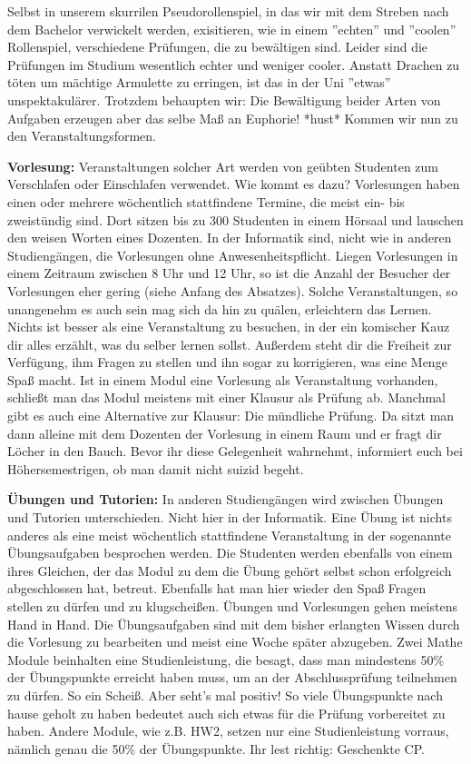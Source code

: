 \spaltenanfang
Selbst in unserem skurrilen Pseudorollenspiel, in das wir mit dem Streben nach dem Bachelor verwickelt werden, exisitieren, wie in einem ''echten'' und ''coolen'' Rollenspiel, verschiedene Prüfungen, die zu bewältigen sind. Leider sind die Prüfungen im Studium wesentlich echter und weniger cooler. Anstatt Drachen zu töten um mächtige Armulette zu erringen, ist das in der Uni ''etwas'' unspektakulärer. Trotzdem behaupten wir: Die Bewältigung beider Arten von Aufgaben erzeugen aber das selbe Maß an Euphorie! *hust* 
Kommen wir nun zu den Veranstaltungsformen.

\textbf{Vorlesung: }
Veranstaltungen solcher Art werden von geübten Studenten zum Verschlafen oder Einschlafen verwendet. Wie kommt es dazu? Vorlesungen haben einen oder mehrere wöchentlich stattfindene Termine, die meist ein- bis zweistündig sind. Dort sitzen bis zu 300 Studenten in einem Hörsaal und lauschen den weisen Worten eines Dozenten. In der Informatik sind, nicht wie in anderen Studiengängen, die Vorlesungen ohne Anwesenheitspflicht. Liegen Vorlesungen in einem Zeitraum zwischen 8 Uhr und 12 Uhr, so ist die Anzahl der Besucher der Vorlesungen eher gering (siehe Anfang des Absatzes). Solche Veranstaltungen, so unangenehm es auch sein mag sich da hin zu quälen, erleichtern das Lernen. Nichts ist besser als eine Veranstaltung zu besuchen, in der ein komischer Kauz dir alles erzählt, was du selber lernen sollst. Außerdem steht dir die Freiheit zur Verfügung, ihm Fragen zu stellen und ihn sogar zu korrigieren, was eine Menge Spaß macht. Ist in einem Modul eine Vorlesung als Veranstaltung vorhanden, schließt man das Modul meistens mit einer Klausur als Prüfung ab. Manchmal gibt es auch eine Alternative zur Klausur: Die mündliche Prüfung. Da sitzt man dann alleine mit dem Dozenten der Vorlesung in einem Raum und er fragt dir Löcher in den Bauch. Bevor ihr diese Gelegenheit wahrnehmt, informiert euch bei Höhersemestrigen, ob man damit nicht suizid begeht.

\textbf{Übungen und Tutorien: }
In anderen Studiengängen wird zwischen Übungen und Tutorien unterschieden. Nicht hier in der Informatik. Eine Übung ist nichts anderes als eine meist wöchentlich stattfindene Veranstaltung in der sogenannte Übungsaufgaben besprochen werden. Die Studenten werden ebenfalls von einem ihres Gleichen, der das Modul zu dem die Übung gehört selbst schon erfolgreich abgeschlossen hat, betreut. Ebenfalls hat man hier wieder den Spaß Fragen stellen zu dürfen und zu klugscheißen. Übungen und Vorlesungen gehen meistens Hand in Hand. Die Übungsaufgaben sind mit dem bisher erlangten Wissen durch die Vorlesung zu bearbeiten und meist eine Woche später abzugeben. Zwei Mathe Module beinhalten eine Studienleistung, die besagt, dass man mindestens 50\% der Übungspunkte erreicht haben muss, um an der Abschlussprüfung teilnehmen zu dürfen. So ein Scheiß. Aber seht's mal positiv! So viele Übungspunkte nach hause geholt zu haben bedeutet auch sich etwas für die Prüfung vorbereitet zu haben. Andere Module, wie z.B. HW2, setzen nur eine Studienleistung vorraus, nämlich genau die 50\% der Übungspunkte. Ihr lest richtig: Geschenkte CP.

